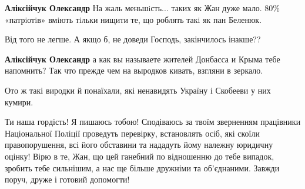 \begin{itemize}
\begin{itemize}
 
\textbf{Аліксійчук Олександр} На жаль меньшiсть... таких як Жан дуже мало. 80\%
«патрiотiв» вмiють тiльки нищити те, що роблять такi як пан Беленюк.

 
Від того не легше. А якщо б, не доведи Господь, закінчилось інакше??

 
\textbf{Аліксійчук Олександр} а как вы называете жителей Донбасса и Крыма тебе
напомнить? Так что прежде чем на выродков кивать, взгляни в зеркало.

 
Ото ж такі виродки й понаїхали, які ненавидять Україну і Скобееви у них кумири.
\end{itemize}

 

Ти наша гордість! Я пишаюсь тобою! Сподіваюсь за твоїм зверненням працівники
Національної Поліції проведуть перевірку, встановлять осіб, які скоїли
правопорушення, всі його обставини та нададуть йому належну юридичну оцінку!
Вірю в те, Жан, що цей ганебний по відношенню до тебе випадок, зробить тебе
сильнішим, а нас ще більше дружніми та об’єднаними. Завжди поруч, друже і
готовий допомогти!


\end{itemize}

